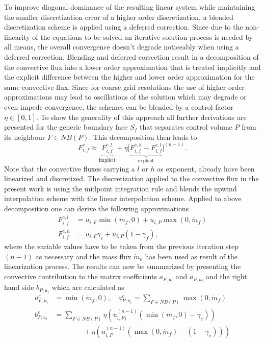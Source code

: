       To improve diagonal dominance of the resulting linear system while maintaining the smaller discretization error of a higher order discretization, a blended discretization scheme is applied using a deferred correction. Since due to the non-linearity of the equations to be solved an iterative solution process is needed by all means, the overall convergence doesn't degrade noticeably when using a deferred correction. Blending and deferred correction result in a decomposition of the convective flux into a lower order approximation that is treated implicitly and the explicit difference between the higher and lower order approximation for the same convective flux. Since for coarse grid resolutions the use of higher order approximations may lead to oscillations of the solution which may degrade or even impede convergence, the schemes can be blended by a control factor \( \eta \in [0,1]\). To show the generality of this approach all further derivations are presented for the generic boundary face \(S_f\) that separates control volume \(P\) from its neighbour \(F \in NB(P)\). This decomposition then leads to
      \begin{displaymath}
        F_{i,f}^c \approx  \underbrace{F_{i,f}^{c,l}}_{\text{implicit}} + \eta \bigl[\underbrace{ F_{i,f}^{c,h} - F_{i,f}^{c,l} }_{\text{explicit}}\bigr]^{(n-1)}.
      \end{displaymath}
      Note that the convective fluxes carrying a \(l\) or \(h\) as exponent, already have been linearized and discretized. The discretization applied to the convective flux in the present work is using the midpoint integration rule and blends the upwind interpolation scheme with the linear interpolation scheme. Applied to above decomposition one can derive the following approximations
      \begin{align*}
        F_{i,f}^{c,l} &= u_{i,F} \min(\dot{m}_f ,0) + u_{i,P} \max(0,\dot{m}_f) \\
        F_{i,f}^{c,h} &= u_{i,F} \gamma_e + u_{i,P} (1 - \gamma_f),
      \end{align*}
      where the variable values have to be taken from the previous iteration step \((n-1)\) as necessary and the mass flux \(\dot{m}_e\) has been used as result of the linearization process. The results can now be summarized by presenting the convective contribution to the matrix coefficients \(a_{F,u_i}\) and \(a_{P,u_i}\) and the right hand side \(b_{P,u_i}\) which are calculated as
      \begin{align}
        a_{F,u_i}^c &= \min(\dot{m}_f ,0), \quad a_{P,u_i}^c = \sum_{F \in NB(P)} \max(0,\dot{m}_f) \\
        b_{P,u_i}^c &= \sum_{F \in NB(P)} \eta  \left(u_{i,F)}^{(n-1)} \left( \min(\dot{m}_f,0) - \gamma_e \right)\right) \nonumber \\
                    &\quad \quad \quad  \quad+ \eta \left( u_{i,P}^{(n-1)} \left( \max(0,\dot{m}_f) - \left(1 - \gamma_e\right) \right)\right)
      \end{align}


